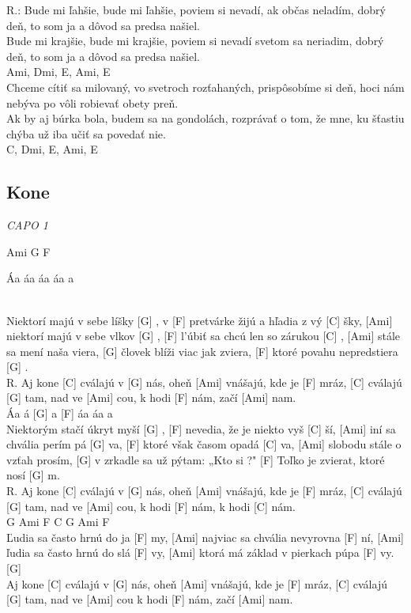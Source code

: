 \documentclass[10pt]{article}
\begin{document}
\begin{Large}
\begin{minipage}{\textwidth}
\begin{multicols}{2}
\begin{guitar}
	R.:
	Bude mi ľahšie, bude mi ľahšie,
	poviem si nevadí, ak občas neladím,
	dobrý deň, to som ja 
	a dôvod sa predsa našiel.
	\\
	Bude mi krajšie, bude mi krajšie,
	poviem si nevadí svetom sa neriadim,
	dobrý deň, to som ja 
	a dôvod sa predsa našiel.
	\\
	Ami, Dmi, E, Ami, E
	\\
	Chceme cítiť sa milovaný,
	vo svetroch rozťahaných,
	prispôsobíme si deň,
	hoci nám nebýva po vôli robievať obety preň.
	\\
	Ak by aj búrka bola,
	budem sa na gondolách,
	rozprávať o tom, že mne,
	ku šťastiu chýba už iba učiť sa povedať nie.
	\\
	C, Dmi, E, Ami, E
\end{guitar}
\end{multicols}
\end{minipage}

\begin{minipage}{\textwidth}
\subsection{Kone}
\textit{CAPO 1}
\begin{multicols}{2}
\begin{guitar}
	
	Ami G F
	
	Áa áa áa áa a
	
	\\
	[Ami] Niektorí majú v sebe líšky [G] ,
	v [F] pretvárke žijú a hľadia z vý [C] šky,
	[Ami] niektorí majú v sebe vlkov [G] ,
	[F] l'úbiť sa chcú len so zárukou [C] ,
	[Ami] stále sa mení naša viera,
	[G] človek blíži viac jak zviera,
	[F] ktoré povahu nepredstiera [G] .
	\\
	R.
	Aj kone [C] cválajú v [G] nás,
	oheň [Ami] vnášajú, kde je [F] mráz,
	[C] cválajú [G] tam, nad ve [Ami] cou,
	k hodi [F] nám, začí [Ami] nam.
	\\
	Áa á [G] a [F] áa áa a
	\\
	[Ami] Niektorým stačí úkryt myší [G] ,
	[F] nevedia, že je niekto vyš [C] ší,
	[Ami] iní sa chvália perím pá [G] va,
	[F] ktoré však časom opadá [C] va,
	[Ami] slobodu stále o vzťah prosím,
	[G] v zrkadle sa už pýtam: „Kto si ?"
	[F] Toľko je zvierat, ktoré nosí [G] m.
	\\
	R.
	Aj kone [C] cválajú v [G] nás,
	oheň [Ami] vnášajú, kde je [F] mráz,
	[C] cválajú [G] tam, nad ve [Ami] cou,
	k hodi [F] nám, k hodi [C] nám. 
	\\
	G Ami F C G Ami F
	\\
	[Ami] Ľudia sa často hrnú do ja [F] my,
	[Ami] najviac sa chvália nevyrovna [F] ní,
	[Ami] ľudia sa často hrnú do slá [F] vy,
	[Ami] ktorá má základ v pierkach púpa [F] vy. [G]
	\\
	Aj kone [C] cválajú v [G] nás,
	oheň [Ami] vnášajú, kde je [F] mráz,
	[C] cválajú [G] tam, nad ve [Ami] cou
	k hodi [F] nám, začí [Ami] nam.
\end{guitar}
\end{multicols}
\end{minipage}


\end{Large}
\end{document}
